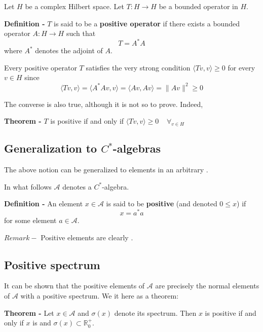 \documentclass[12pt]{article}
\begin{document}
Let $H$ be a complex Hilbert space. Let $T:H \longrightarrow H$ be a bounded operator in $H$.

{\bf Definition -} $T$ is said to be a {\bf positive operator} if there exists a bounded operator $A: H \longrightarrow H$ such that
\begin{displaymath}
T=A^*A
\end{displaymath}
where $A^*$ denotes the adjoint of $A$.

Every positive operator $T$ satisfies the very strong condition $\langle T v , v \rangle \geq 0$ for every $v \in H$ since
\begin{displaymath}
\langle T v , v \rangle = \langle A^*A v , v \rangle = \langle A v , Av \rangle = \|Av\|^2 \geq 0
\end{displaymath}

The converse is also true, although it is not so  to prove. Indeed,

{\bf Theorem -} $T$ is positive if and only if $\langle Tv, v \rangle \geq 0 \;\;\;\;\forall_{v \in H}$

\subsection{Generalization to $C^*$-algebras}

The above notion can be generalized to elements in an arbitrary .

In what follows $\mathcal{A}$ denotes a $C^*$-algebra.

{\bf Definition -} An element $x \in \mathcal{A}$ is said to be {\bf positive} (and denoted $0 \leq x$) if
\begin{displaymath}
x=a^*a
\end{displaymath}
for some element $a \in \mathcal{A}$.

$Remark -$ Positive elements are clearly .

\subsection{Positive spectrum}

It can be shown that the positive elements of $\mathcal{A}$ are precisely the normal elements of $\mathcal{A}$ with a positive spectrum. We  it here as a theorem:

{\bf Theorem -} Let $x \in \mathcal{A}$ and $\sigma(x)$ denote its spectrum. Then $x$ is positive if and only if $x$ is  and $\sigma(x)\subset \mathbb{R}_{0}^+$.
\end{document}
